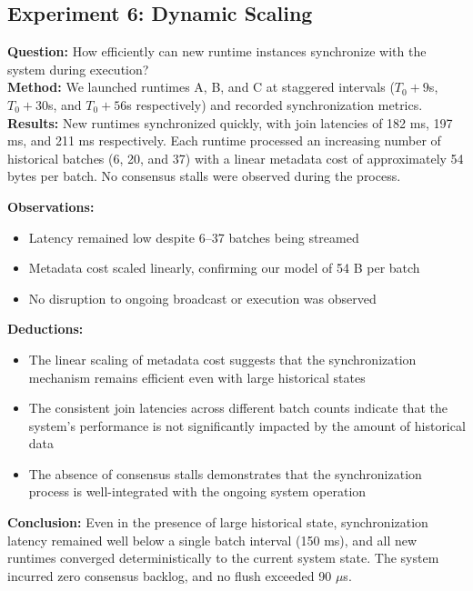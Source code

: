 \documentclass[10pt, 
]{IEEEtran}
\begin{document}
\subsection{Experiment 6: Dynamic Scaling}
\textbf{Question:} How efficiently can new runtime instances synchronize with the system during execution? \\
\textbf{Method:} We launched runtimes A, B, and C at staggered intervals ($T_0 + 9$s, $T_0 + 30$s, and $T_0 + 56$s respectively) and recorded synchronization metrics. \\
\textbf{Results:} New runtimes synchronized quickly, with join latencies of 182 ms, 197 ms, and 211 ms respectively. Each runtime processed an increasing number of historical batches (6, 20, and 37) with a linear metadata cost of approximately 54 bytes per batch. No consensus stalls were observed during the process.

\textbf{Observations:}
\begin{itemize}
    \item Latency remained low despite 6–37 batches being streamed
    \item Metadata cost scaled linearly, confirming our model of 54 B per batch
    \item No disruption to ongoing broadcast or execution was observed
\end{itemize}
\textbf{Deductions:}
\begin{itemize}
    \item The linear scaling of metadata cost suggests that the synchronization mechanism remains efficient even with large historical states
    \item The consistent join latencies across different batch counts indicate that the system's performance is not significantly impacted by the amount of historical data
    \item The absence of consensus stalls demonstrates that the synchronization process is well-integrated with the ongoing system operation
\end{itemize}
\textbf{Conclusion:} Even in the presence of large historical state, synchronization latency remained well below a single batch interval (150 ms), and all new runtimes converged deterministically to the current system state. The system incurred zero consensus backlog, and no flush exceeded 90 $\mu$s.
\end{document}

